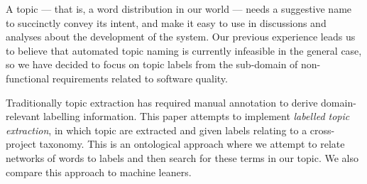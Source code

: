 \documentclass{acm_proc_article-sp}
\newcommand{\XXX}[1]{\textcolor{red}{{\it \textbf{[XXX: #1]}}}}
\begin{document}

A topic --- that is, a word distribution in our world --- needs a suggestive name to succinctly convey its intent, and make it easy to use in discussions and analyses about the development of the system. Our previous experience leads us to believe that automated topic naming is currently infeasible in the general case, so we have decided to focus on topic labels from the sub-domain of non-functional requirements related to software quality.




Traditionally topic extraction has required manual annotation to derive domain-relevant labelling information. This paper attempts to implement \emph{labelled topic extraction}, in which topic are extracted and given labels relating to a cross-project taxonomy. This is an ontological approach where we attempt to relate networks of words to labels and then search for these terms in our topic. We also compare this approach to machine leaners.

\end{document}
